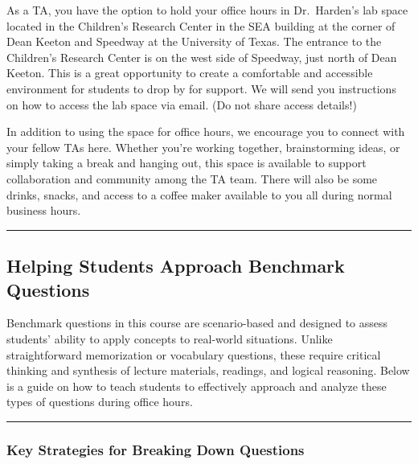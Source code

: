 \documentclass[
]{article}
\begin{document}
As a TA, you have the option to hold your office hours in Dr.~Harden's lab space located in the Children's Research Center in the SEA building at the corner of Dean Keeton and Speedway at the University of Texas. The entrance to the Children's Research Center is on the west side of Speedway, just north of Dean Keeton. This is a great opportunity to create a comfortable and accessible environment for students to drop by for support. We will send you instructions on how to access the lab space via email. (Do not share access details!)

In addition to using the space for office hours, we encourage you to connect with your fellow TAs here. Whether you're working together, brainstorming ideas, or simply taking a break and hanging out, this space is available to support collaboration and community among the TA team. There will also be some drinks, snacks, and access to a coffee maker available to you all during normal business hours.

\begin{center}\rule{0.5\linewidth}{0.5pt}\end{center}

\hypertarget{helping-students-approach-benchmark-questions}{%
\subsection{Helping Students Approach Benchmark Questions}\label{helping-students-approach-benchmark-questions}}

Benchmark questions in this course are scenario-based and designed to assess students' ability to apply concepts to real-world situations. Unlike straightforward memorization or vocabulary questions, these require critical thinking and synthesis of lecture materials, readings, and logical reasoning. Below is a guide on how to teach students to effectively approach and analyze these types of questions during office hours.

\begin{center}\rule{0.5\linewidth}{0.5pt}\end{center}

\hypertarget{key-strategies-for-breaking-down-questions}{%
\subsubsection*{Key Strategies for Breaking Down Questions}\label{key-strategies-for-breaking-down-questions}}
\end{document}

